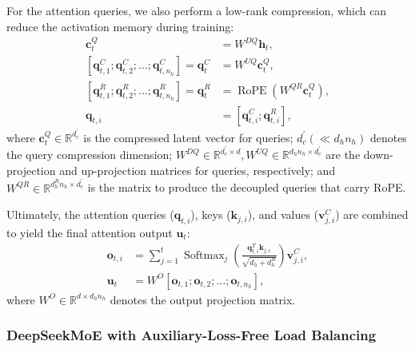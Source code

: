 \documentclass[11pt, a4paper, logo, copyright, nonumbering]{deepseek}
\newcommand{\dsmoe}{DeepSeekMoE}
\begin{document}
\begin{CJK*}{UTF8}{gbsn}
For the attention queries, we also perform a low-rank compression, which can reduce the activation memory during training:
\begin{align}
    \mathbf{c}_{t}^{Q} &= W^{DQ} \mathbf{h}_{t}, \\
    [\mathbf{q}_{t, 1}^{C};\mathbf{q}_{t, 2}^{C};...;\mathbf{q}_{t, n_{h}}^{C}] = \mathbf{q}_{t}^{C} &= W^{UQ} \mathbf{c}_{t}^{Q}, \\
    [\mathbf{q}_{t, 1}^{R};\mathbf{q}_{t, 2}^{R};...;\mathbf{q}_{t, n_{h}}^{R}] = \mathbf{q}_{t}^{R} &= \operatorname{RoPE}({W^{QR}} \mathbf{c}_{t}^{Q}), \\
    \mathbf{q}_{t, i} &= [\mathbf{q}_{t, i}^{C}; \mathbf{q}_{t, i}^{R}],
\end{align}
where $\mathbf{c}_{t}^{Q} \in \mathbb{R}^{d_c^{\prime}}$ is the compressed latent vector for queries; 
$d_c^{\prime} (\ll d_h n_h)$ denotes the query compression dimension; 
$W^{DQ} \in \mathbb{R}^{d_c^{\prime} \times d}, W^{UQ} \in \mathbb{R}^{d_h n_h \times d_c^{\prime}}$ are the down-projection and up-projection matrices for queries, respectively;
and $W^{QR} \in \mathbb{R}^{d_h^R n_h \times d_c^{\prime}}$ is the matrix to produce the decoupled queries that carry RoPE. 

Ultimately, the attention queries ($\mathbf{q}_{t, i}$), keys ($\mathbf{k}_{j, i}$), and values ($\mathbf{v}_{j, i}^{C}$) are combined to yield the final attention output $\mathbf{u}_{t}$:
\begin{align}
    \mathbf{o}_{t, i} &= \sum_{j=1}^{t} \operatorname{Softmax}_j(\frac{\mathbf{q}_{t, i}^T \mathbf{k}_{j, i}}{\sqrt{d_{h} + d_{h}^{R}}}) \mathbf{v}_{j, i}^{C}, \\
    \mathbf{u}_{t} &= W^{O} [\mathbf{o}_{t, 1};\mathbf{o}_{t, 2};...;\mathbf{o}_{t, n_{h}}],
\end{align}
where $W^{O} \in \mathbb{R}^{d \times d_h n_h}$ denotes the output projection matrix. 

\subsubsection{\dsmoe{} with Auxiliary-Loss-Free Load Balancing}


\end{CJK*}
\end{document}
